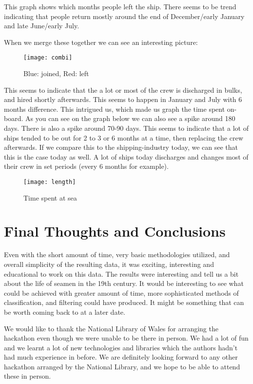 \documentclass{article}
\begin{document}
This graph shows which months people left the ship. There seems to be trend indicating that people return mostly around the end of December/early January and late June/early July.

When we merge these together we can see an interesting picture:

\begin{figure}[H]
	\centering
	\texttt{[image: combi]}
  	\caption{Blue: joined, Red: left}
\end{figure}

This seems to indicate that the a lot or most of the crew is discharged in bulks, and hired shortly afterwards. This seems to happen in January and July with 6 months difference.
This intrigued us, which made us graph the time spent on-board. As you can see on the graph below we can also see a spike around 180 days. There is also a spike around 70-90 days. This seems to indicate that a lot of ships tended to be out for 2 to 3 or 6 months at a time, then replacing the crew afterwards.
If we compare this to the shipping-industry today, we can see that this is the case today as well.
A lot of ships today discharges and changes most of their crew in set periods (every 6 months for example).

\begin{figure}[H]
	\centering
	\texttt{[image: length]}
  	\caption{Time spent at sea}
\end{figure}

\section{Final Thoughts and Conclusions}

Even with the short amount of time, very basic methodologies utilized, and overall simplicity of the resulting data, it was exciting, interesting and educational to work on this data. 
The results were interesting and tell us a bit about the life of seamen in the 19th century.
It would be interesting to see what could be achieved with greater amount of time, more sophisticated methods of classification, and filtering could have produced.
It might be something that can be worth coming back to at a later date.

We would like to thank the National Library of Wales for arranging the hackathon even though we were unable to be there in person.
We had a lot of fun and we learnt a lot of new technologies and libraries which the authors hadn't had much experience in before.
We are definitely looking forward to any other hackathon arranged by the National Library, and we hope to be able to attend these in person.
\end{document}
